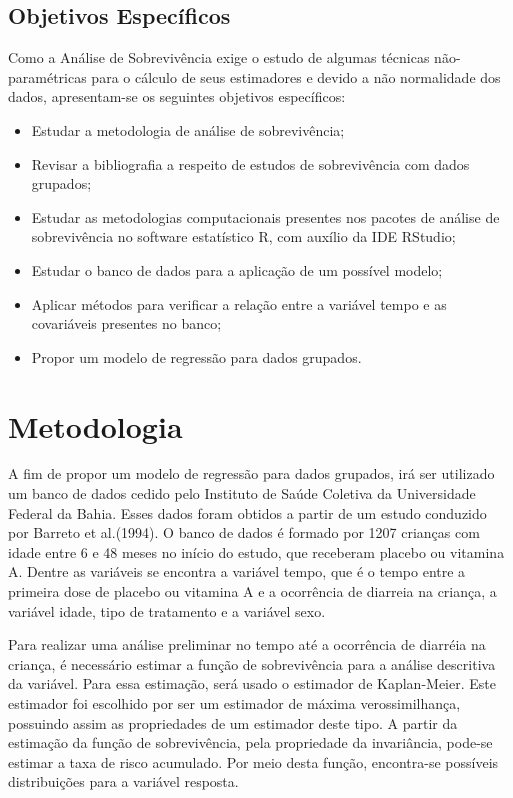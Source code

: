 \subsection*{Objetivos Específicos}

Como a Análise de Sobrevivência exige o estudo de algumas técnicas não-paramétricas para o cálculo de seus estimadores e devido a não normalidade dos dados, apresentam-se os seguintes objetivos específicos:

\begin{itemize}
	
	\item Estudar a metodologia de análise de sobrevivência;
	\item Revisar a bibliografia a respeito de estudos de sobrevivência com dados grupados;	
	\item Estudar as metodologias computacionais presentes nos pacotes de análise de sobrevivência no software estatístico R, com auxílio da IDE RStudio;
	\item Estudar o banco de dados para a aplicação de um possível modelo;
	\item Aplicar métodos para verificar a relação entre a variável tempo e as covariáveis presentes no banco;
	\item Propor um modelo de regressão para dados grupados.
\end{itemize}

\vspace{1cm}

\section*{Metodologia}

A fim de propor um modelo de regressão para dados grupados, irá ser utilizado um banco de dados cedido pelo Instituto de Saúde Coletiva da Universidade Federal da Bahia. Esses dados foram obtidos a partir de um estudo conduzido por Barreto et al.(1994). O banco de dados é formado por 1207 crianças com idade entre 6 e 48 meses no início do estudo, que receberam placebo ou vitamina A. Dentre as variáveis se encontra a variável tempo, que é o tempo entre a primeira dose de placebo ou vitamina A e a ocorrência de diarreia na criança, a variável idade, tipo de tratamento e a variável sexo.

Para realizar uma análise preliminar no tempo até a ocorrência de diarréia na criança, é necessário estimar a função de sobrevivência para a análise descritiva da variável. Para essa estimação, será usado o estimador de Kaplan-Meier. Este estimador foi escolhido por ser um estimador de máxima verossimilhança, possuindo assim as propriedades de um estimador deste tipo. A partir da estimação da função de sobrevivência, pela propriedade da invariância, pode-se estimar a taxa de risco acumulado. Por meio desta função, encontra-se possíveis distribuições para a variável resposta.

